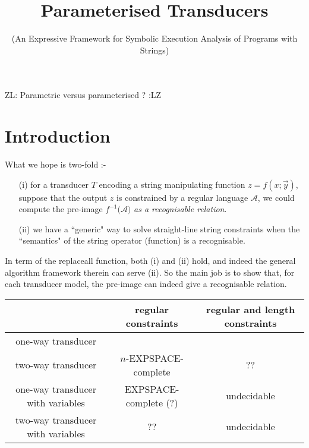 \documentclass{llncs}
\newcommand{\zhilin}[1]{\color{brown} {ZL: #1 :LZ} \color{black}}
\newcommand{\zhilin}[1]{}
\begin{document}
\title{Parameterised Transducers}
\subtitle{(An Expressive Framework for Symbolic 
Execution Analysis of Programs with Strings)}

\author{}
\institute{}

\maketitle

\zhilin{Parametric versus parameterised ?}






\section{Introduction}

What we hope is two-fold :-
\begin{itemize}
	\item[(i)]  for a transducer $T$ encoding a string manipulating function $z=f(x;\vec{y})$, suppose that  the output $z$ is constrained by a regular language $\mathcal{A}$, we could compute the pre-image $f^{-1}(\mathcal{A)}$ \emph{as a recognisable relation}.

	\item[(ii)] we have a ``generic" way to solve straight-line string constraints when the ``semantics" of the string operator (function) is a recognisable.
\end{itemize}

In term of the replaceall function, both (i) and (ii) hold, and indeed the general algorithm framework therein can serve (ii). So the main job is to show that, for each transducer model, the pre-image can indeed give a recognisable relation.

\begin{tabular}{|c|c|c|}
	\hline

						 &  regular constraints    &  regular and length constraints \\
	\hline
	\hline
one-way transducer						 &  \cite{LB16}            &   \cite{LB16}                   \\
two-way transducer						 &  $n$-EXPSPACE-complete  &   ??                            \\
one-way transducer	with variables       &  EXPSPACE-complete (?)  &  undecidable \cite{CCHLW18}     \\
two-way transducer  with variables       &       ??               & undecidable \cite{CCHLW18}     \\
\hline
\end{tabular}
\end{document}
